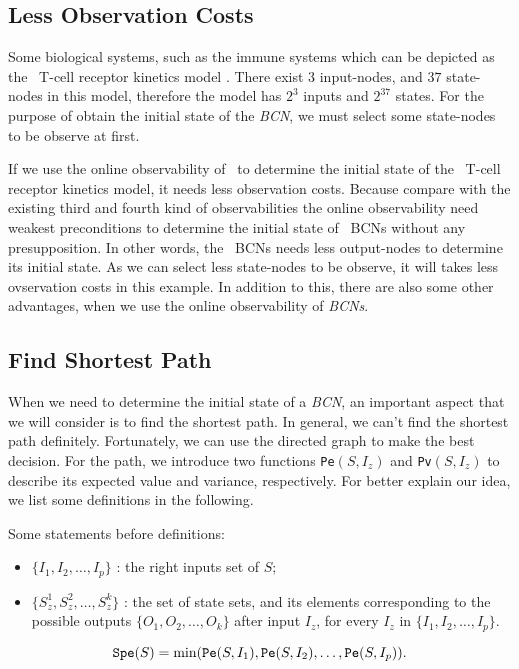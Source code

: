 \subsection{Less Observation Costs}
Some biological systems, such as the immune systems which can be depicted as the \BCN\ T-cell receptor kinetics model \cite{Klamt2006A}. There exist $3$ input-nodes, and $37$ state-nodes in this model, therefore the model has $2^3$ inputs and $2^{37}$ states. For the purpose of obtain the initial state of the {\em BCN}, we must select some state-nodes to be observe at first. 

If we use the online observability of \BCNs\ to determine the initial state of the \BCN\ T-cell receptor kinetics model, it needs less observation costs. Because compare with the existing third and fourth kind of observabilities the online observability need weakest preconditions to determine the initial state of {\ BCNs} without any presupposition. In other words, the {\ BCNs} needs less output-nodes to determine its initial state. As we can select less state-nodes to be observe, it will takes less ovservation costs in this example. In addition to this, there are also some other advantages, when we use the online observability of {\em BCNs}.

\subsection{Find Shortest Path}
When we need to determine the initial state of a {\em BCN}, an important aspect that we will consider is to find the shortest path. In general, we can't find the shortest path definitely.  Fortunately, we can use the directed graph to make the best decision. For the path, we introduce two functions {\tt Pe}$(S, I_z)$ and {\tt Pv}$(S, I_z)$ to describe its expected value and variance, respectively. For better explain our idea, we list some definitions in the following.



Some statements before definitions:
\begin{itemize}
  \item $\{I_1,I_2,\ldots, I_p\}$ : the right inputs set of $S$;
  \item $\{S_z^1,S_z^2,\ldots, S_z^k\}$ : the set of state sets, and its elements corresponding to the possible outputs $\{O_1,O_2,\ldots,O_k\}$ after input $I_z$, for every $I_z$ in $\{I_1,I_2,\ldots, I_p\}$.
\end{itemize} 
\begin{definition}[{\tt Spe}$(S)$] \label{lspe}
 \[{\tt Spe}(S)= \min({\tt Pe}(S, I_1),{\tt Pe}(S, I_2),\ldots,{\tt Pe}(S, I_p)).\] 
\end{definition}


